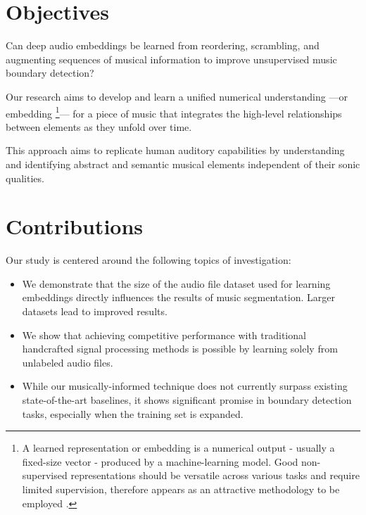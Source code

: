\section{Objectives}

Can deep audio embeddings be learned from reordering, scrambling, and augmenting sequences of musical information to improve unsupervised music boundary detection?

Our research aims to develop and learn a unified numerical understanding ---or embedding \footnote{A learned representation or embedding is a numerical output - usually a fixed-size vector - produced by a machine-learning model. Good non-supervised representations should be versatile across various tasks and require limited supervision, therefore appears as an attractive methodology to be employed \cite{Turian2022HEAR:Representations}.}--- for a piece of music that integrates the high-level relationships between elements as they unfold over time.

This approach aims to replicate human auditory capabilities by understanding and identifying abstract and semantic musical elements independent of their sonic qualities.

\section{Contributions}

Our study is centered around the following topics of investigation:

\begin{itemize}
    \item We demonstrate that the size of the audio file dataset used for learning embeddings directly influences the results of music segmentation. Larger datasets lead to improved results.
    \item We show that achieving competitive performance with traditional handcrafted signal processing methods is possible by learning solely from unlabeled audio files.
    \item While our musically-informed technique does not currently surpass existing state-of-the-art baselines, it shows significant promise in boundary detection tasks, especially when the training set is expanded.
\end{itemize}